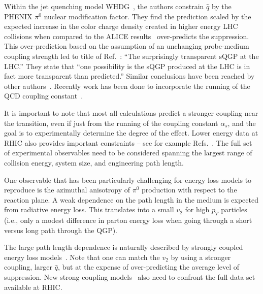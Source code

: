 Within the jet quenching model WHDG~\cite{Horowitz:2011gd}, the authors 
constrain $\hat{q}$ by the PHENIX $\pi^{0}$ nuclear modification factor.  
They find the prediction scaled by the expected increase in the color charge 
density created in higher energy LHC collisions when compared to the ALICE
results~\cite{Aamodt:2010jd} over-predicts the suppression.
This over-prediction based on the assumption of an unchanging probe-medium
coupling strength led to title of Ref.~\cite{Horowitz:2011gd}: ``The
surprisingly transparent sQGP at the LHC.''  They state that ``one
possibility is the sQGP produced at the LHC is in fact more
transparent than predicted.''  Similar conclusions have been reached
by other authors~\cite{Chen:2011vt,Zakharov:2011ws,Buzzatti:2011vt}.
Recently work has been done to incorporate the running of the QCD coupling
constant~\cite{Buzzatti:2012dy}.  

It is important to note that most all calculations predict a stronger
coupling near the transition, even if just from the running of the
coupling constant $\alpha_{s}$, and the goal is to experimentally
determine the degree of the effect.  Lower energy data at RHIC also
provides important constraints -- see for example
Refs.~\cite{Adare:2012uk,Schmah:2013vea}.  The full set of
experimental observables need to be considered spanning the largest
range of collision energy, system size, and engineering path length.

One observable that has been particularly challenging for energy loss
models to reproduce is the azimuthal anisotropy of $\pi^0$ production
with respect to the reaction plane.  A weak dependence on the path
length in the medium is expected from radiative energy loss.  This
translates into a small $v_2$ for high $p_T$ particles (i.e., only a
modest difference in parton energy loss when going through a short
versus long path through the QGP).  


The large path length
dependence is naturally described by strongly coupled energy loss
models~\cite{Marquet:2009eq,Adare:2010sp}.  Note that one can match
the $v_2$ by using a stronger coupling, larger $\hat{q}$, but at the
expense of over-predicting the average level of suppression.  New
strong coupling
models~\cite{Casalderrey-Solana:2014wca,Casalderrey-Solana:2014bpa}
also need to confront the full data set available at RHIC.

